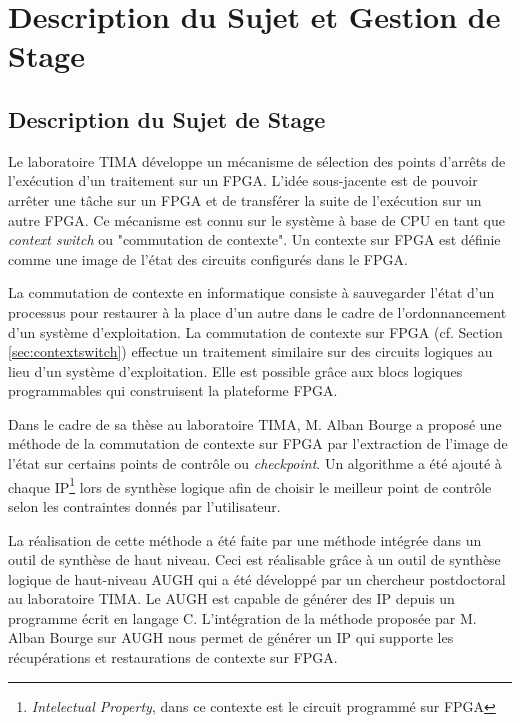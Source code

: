 \chapter{Description du Sujet et Gestion de Stage}
\label{chap:sujet}
\OnehalfSpacing

\section{Description du Sujet de Stage}
\label{sec:sujet}

Le laboratoire TIMA développe un mécanisme de sélection des points
d'arrêts de l'exécution d'un traitement sur un FPGA. L'idée sous-jacente
est de pouvoir arrêter une tâche sur un FPGA et de transférer la suite de
l'exécution sur un autre FPGA.
Ce mécanisme est connu sur le système à base de CPU 
en tant que \emph{context switch} ou "commutation de contexte".
Un contexte sur FPGA est définie comme une image de l'état des circuits configurés dans le FPGA.

La commutation de contexte en informatique consiste à sauvegarder
l'état d'un processus pour restaurer à la place d'un autre dans le cadre de l'ordonnancement 
d'un système d'exploitation. La commutation de contexte sur FPGA (cf. Section \ref{sec:contextswitch}) 
effectue un traitement similaire sur des circuits logiques au lieu d'un système d'exploitation. 
Elle est possible grâce aux blocs logiques programmables
qui construisent la plateforme FPGA.

Dans le cadre de sa thèse au laboratoire TIMA, M. Alban Bourge a proposé une méthode de la commutation 
de contexte sur FPGA par l'extraction de l'image de l'état sur certains points de contrôle\cite{Bourge2015} ou \emph{checkpoint}. 
Un algorithme a été ajouté à chaque IP\footnote{\emph{Intelectual Property}, dans ce contexte est le circuit programmé sur FPGA} lors de synthèse logique
afin de choisir le meilleur point de contrôle selon les contraintes donnés par l'utilisateur.

La réalisation de cette méthode a été faite par une méthode intégrée dans un outil de synthèse de haut niveau.
Ceci est réalisable grâce à un outil de synthèse logique de haut-niveau AUGH\cite{Prost2014} 
qui a été développé par un chercheur postdoctoral au laboratoire TIMA.
Le AUGH est capable de générer des IP 
depuis un programme écrit en langage C. L'intégration de la méthode proposée par M. Alban Bourge sur AUGH 
nous permet de générer un IP qui supporte les récupérations et restaurations de contexte sur FPGA.

